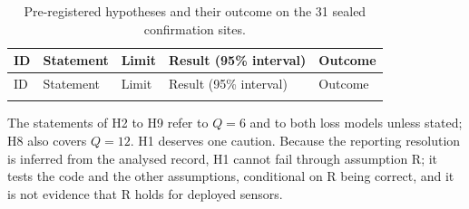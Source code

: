 {\footnotesize
\begin{longtable}{@{}p{0.7cm}p{2.7cm}p{2.1cm}p{4.5cm}p{1.8cm}@{}}
\caption{Pre-registered hypotheses and their outcome on the 31 sealed confirmation sites.}\label{tab:hyp}\\
\toprule
ID & Statement & Limit & Result (95\% interval) & Outcome \\
\midrule
\endfirsthead
\toprule
ID & Statement & Limit & Result (95\% interval) & Outcome \\
\midrule
\endhead
\bottomrule
\endfoot

\end{longtable}
}

The statements of H2 to H9 refer to $Q = 6$ and to both loss models unless stated; H8 also covers $Q = 12$. H1 deserves one caution. Because the reporting resolution is inferred from the analysed record, H1 cannot fail through assumption R; it tests the code and the other assumptions, conditional on R being correct, and it is not evidence that R holds for deployed sensors.
